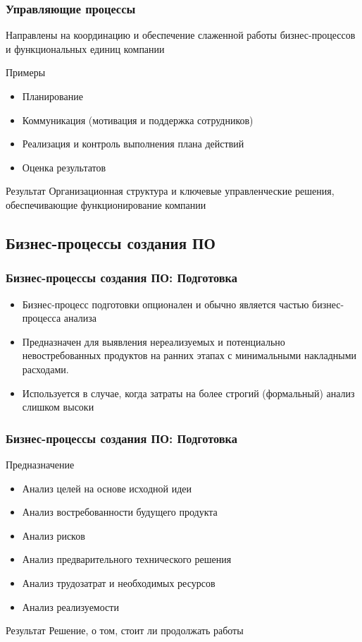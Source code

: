 \documentclass{../industrial-development}
\begin{document}
\begin{frame} \frametitle{Управляющие процессы}
	\begin{block}{}
		Направлены на координацию и обеспечение слаженной работы бизнес-процессов и функциональных единиц компании
	\end{block}
	\begin{block}{Примеры}
		\begin{itemize}
		\item Планирование
		\item Коммуникация (мотивация и поддержка сотрудников)
		\item Реализация и контроль выполнения плана действий
		\item Оценка результатов
		\end{itemize}
	\end{block}
	\begin{block}{Результат}
		Организационная структура и ключевые управленческие решения, обеспечивающие функционирование компании
	\end{block}
\end{frame}
\lecturenotes


\subsection{Бизнес-процессы создания ПО}


\begin{frame} \frametitle{Бизнес-процессы создания ПО: Подготовка}
	\begin{itemize}
		\item Бизнес-процесс подготовки опционален и обычно является частью бизнес-процесса анализа
		\item Предназначен для выявления нереализуемых и потенциально невостребованных продуктов на ранних этапах с минимальными накладными расходами.
		\item Используется в случае, когда затраты на более строгий (формальный) анализ слишком высоки
	\end{itemize}
\end{frame}
\lecturenotes


\begin{frame} \frametitle{Бизнес-процессы создания ПО: Подготовка}
	\begin{block}{Предназначение}
		\begin{itemize}
			\item Анализ целей на основе исходной идеи
			\item Анализ востребованности будущего продукта
			\item Анализ рисков
			\item Анализ предварительного технического решения
			\item Анализ трудозатрат и необходимых ресурсов
			\item Анализ реализуемости
		\end{itemize}
	\end{block}
	\begin{block}{Результат}
		Решение, о том, стоит ли продолжать работы
	\end{block}
\end{frame}
\lecturenotes
\end{document}
